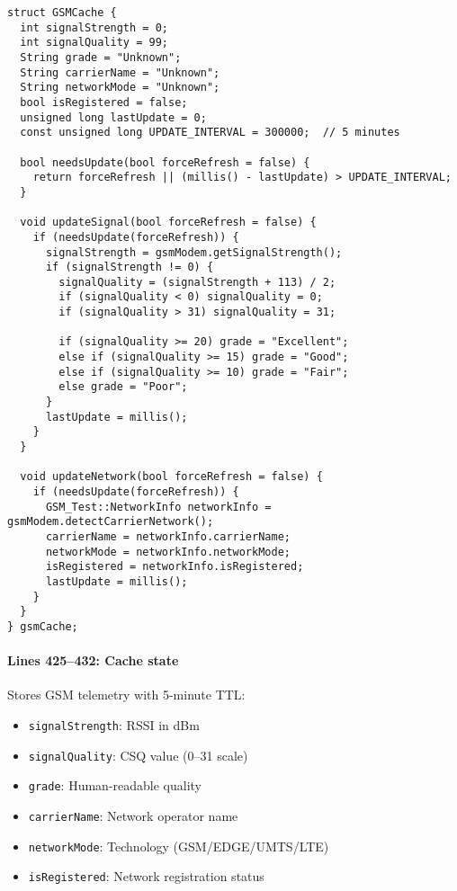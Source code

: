\documentclass[11pt,a4paper]{article}
\begin{document}
\begin{verbatim}
struct GSMCache {
  int signalStrength = 0;
  int signalQuality = 99;
  String grade = "Unknown";
  String carrierName = "Unknown";
  String networkMode = "Unknown";
  bool isRegistered = false;
  unsigned long lastUpdate = 0;
  const unsigned long UPDATE_INTERVAL = 300000;  // 5 minutes

  bool needsUpdate(bool forceRefresh = false) {
    return forceRefresh || (millis() - lastUpdate) > UPDATE_INTERVAL;
  }

  void updateSignal(bool forceRefresh = false) {
    if (needsUpdate(forceRefresh)) {
      signalStrength = gsmModem.getSignalStrength();
      if (signalStrength != 0) {
        signalQuality = (signalStrength + 113) / 2;
        if (signalQuality < 0) signalQuality = 0;
        if (signalQuality > 31) signalQuality = 31;
        
        if (signalQuality >= 20) grade = "Excellent";
        else if (signalQuality >= 15) grade = "Good";
        else if (signalQuality >= 10) grade = "Fair";
        else grade = "Poor";
      }
      lastUpdate = millis();
    }
  }

  void updateNetwork(bool forceRefresh = false) {
    if (needsUpdate(forceRefresh)) {
      GSM_Test::NetworkInfo networkInfo = gsmModem.detectCarrierNetwork();
      carrierName = networkInfo.carrierName;
      networkMode = networkInfo.networkMode;
      isRegistered = networkInfo.isRegistered;
      lastUpdate = millis();
    }
  }
} gsmCache;
\end{verbatim}

\paragraph{Lines 425--432: Cache state}
Stores GSM telemetry with 5-minute TTL:
\begin{itemize}[leftmargin=*]
  \item \texttt{signalStrength}: RSSI in dBm
  \item \texttt{signalQuality}: CSQ value (0--31 scale)
  \item \texttt{grade}: Human-readable quality
  \item \texttt{carrierName}: Network operator name
  \item \texttt{networkMode}: Technology (GSM/EDGE/UMTS/LTE)
  \item \texttt{isRegistered}: Network registration status
\end{itemize}
\end{document}
